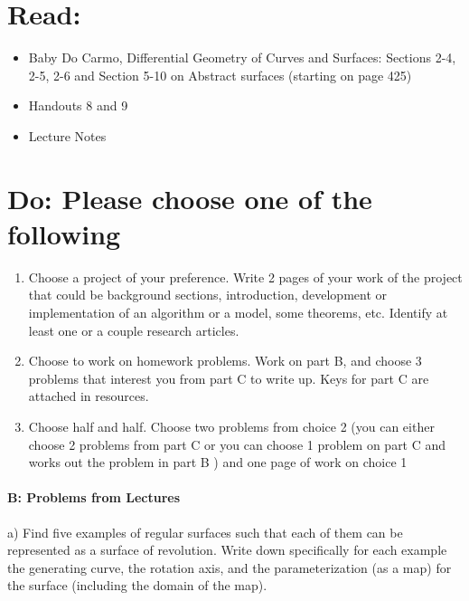 \documentclass[12pt]{article}
\title{\rightline {\Huge {Due: Wednesday, October 11}}}
\author{\LARGE {HMC\quad Math 142 \quad Fall 2017} 
\\ {Prof. Gu}  
\\ {\LARGE Problem Set 6}}
\date{Start this assignment before Sunday night!}
\begin{document}
\maketitle

\section*{ Read: } 

\begin{itemize}
\item{Baby Do Carmo, Differential Geometry
    of Curves and Surfaces:  
Sections 2-4, 2-5, 2-6 and Section 5-10 on Abstract surfaces (starting 
on page 425)} 
\item{Handouts 8 and 9}
\item{Lecture Notes}
\end{itemize}

\section*{ Do: Please choose one of the following}
\begin{enumerate}
    \item Choose a project of your preference. Write 2 pages of your work of the project that could be background sections, introduction, development or implementation of an algorithm or a model, some theorems, etc.  Identify at least one or a couple research articles.
    \item Choose to work on homework problems. Work on part B, and choose 3 problems that interest you from part C to write up. Keys for part C are attached in resources.
    \item Choose half and half. Choose two problems from choice 2 (you can either choose 2 problems from part C or you can choose 1 problem on part C and works out the problem in part B ) and one page of work on choice 1
\end{enumerate}



\medskip
\paragraph{B: Problems from Lectures}

\begin{itemize}

{\item a) Find five examples of regular surfaces such that each of 
them can be represented as a surface of revolution.  Write down
specifically for each example the generating curve, the rotation 
axis, and the parameterization (as a map) for the surface (including
the domain of the map).}

\end{itemize}
\end{document}
